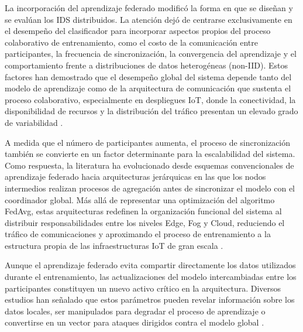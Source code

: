 \documentclass[journal,article,submit,moreauthors]{Definitions/mdpi}
\begin{document}
La incorporación del aprendizaje federado modificó la forma en que se diseñan y se evalúan los IDS distribuidos. La atención dejó de centrarse exclusivamente en el desempeño del clasificador para incorporar aspectos propios del proceso colaborativo de entrenamiento, como el costo de la comunicación entre participantes, la frecuencia de sincronización, la convergencia del aprendizaje y el comportamiento frente a distribuciones de datos heterogéneas (non-IID). Estos factores han demostrado que el desempeño global del sistema depende tanto del modelo de aprendizaje como de la arquitectura de comunicación que sustenta el proceso colaborativo, especialmente en despliegues IoT, donde la conectividad, la disponibilidad de recursos y la distribución del tráfico presentan un elevado grado de variabilidad \cite{Imteaj2022,Hajj2023,Chaurasia2024,Albanbay2025,Ramadan2025}.
%

A medida que el número de participantes aumenta, el proceso de sincronización también se convierte en un factor determinante para la escalabilidad del sistema. Como respuesta, la literatura ha evolucionado desde esquemas convencionales de aprendizaje federado hacia arquitecturas jerárquicas en las que los nodos intermedios realizan procesos de agregación antes de sincronizar el modelo con el coordinador global. Más allá de representar una optimización del algoritmo FedAvg, estas arquitecturas redefinen la organización funcional del sistema al distribuir responsabilidades entre los niveles Edge, Fog y Cloud, reduciendo el tráfico de comunicaciones y aproximando el proceso de entrenamiento a la estructura propia de las infraestructuras IoT de gran escala \cite{Ficco2024,Tran2026,Ramadan2025}.
%

Aunque el aprendizaje federado evita compartir directamente los datos utilizados durante el entrenamiento, las actualizaciones del modelo intercambiadas entre los participantes constituyen un nuevo activo crítico en la arquitectura. Diversos estudios han señalado que estos parámetros pueden revelar información sobre los datos locales, ser manipulados para degradar el proceso de aprendizaje o convertirse en un vector para ataques dirigidos contra el modelo global \cite{Imteaj2022,Hajj2023}.
%
\end{document}
